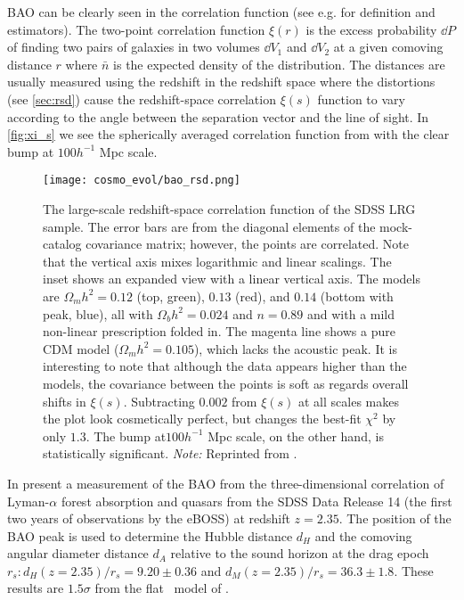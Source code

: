 BAO can be clearly seen in the correlation function (see e.g. \cite{1993ApJ...412...64L} for definition and estimators). The two-point correlation function $\xi(r)$ is the excess probability $\dd P$ of finding two pairs of galaxies in two volumes $\dd V_1$ and $\dd V_2$ at a given comoving distance $r$
where $\bar{n}$ is the expected density of the distribution. The distances are usually measured using the redshift in the redshift space where the distortions (see \autoref{sec:rsd}) cause the redshift-space correlation $\xi(s)$ function to vary according to the angle between the separation vector and the line of sight. In \autoref{fig:xi_s} we see the spherically averaged correlation function from \textcite{2005ApJ...633..560E} with the clear bump at $100h^{-1}$ Mpc scale.
\begin{figure}[hbt]
    \centering
    \texttt{[image: cosmo\_evol/bao\_rsd.png]}
    \caption{The large-scale redshift-space correlation function of the SDSS LRG sample. The error bars are from the diagonal elements of the mock-catalog covariance matrix; however, the points are correlated. Note that the vertical axis mixes logarithmic and linear scalings. The inset shows an expanded view with a linear vertical axis. The models are $\Omega_mh^2=0.12$ (top, green), $0.13$ (red), and $0.14$ (bottom with peak, blue), all with $\Omega_bh^2=0.024$ and $n=0.89$ and with a mild non-linear prescription folded in. The magenta line shows a pure CDM model ($\Omega_mh^2=0.105$), which lacks the acoustic peak. It is interesting to note that although the data appears higher than the models, the covariance between the points is soft as regards overall shifts in $\xi(s)$. Subtracting $0.002$ from $\xi(s)$ at all scales makes the plot look cosmetically perfect, but changes the best-fit $\chi^2$ by only $1.3$. The bump at$100h^{-1}$ Mpc scale, on the other hand, is statistically significant. \textit{Note:} Reprinted from \textcite{2005ApJ...633..560E}.}
    \label{fig:xi_s}
\end{figure}

In \textcite{BAO_results} present a measurement of the BAO from the three-dimensional correlation of Lyman-$\alpha$ forest absorption and quasars from the SDSS Data Release 14 (the first two years of observations by the eBOSS) at redshift $z=2.35$. The position of the BAO peak is used to determine the Hubble distance $d_H$ and the comoving angular diameter distance $d_A$ relative to the sound horizon at the drag epoch $r_s: d_H(z=2.35)/r_s = 9.20\pm0.36$ and $d_M(z=2.35)/r_s = 36.3\pm1.8$. These results are $1.5\sigma$ from the flat \LCDM\ model of \textcite{2016A&A...594A..13P}.
